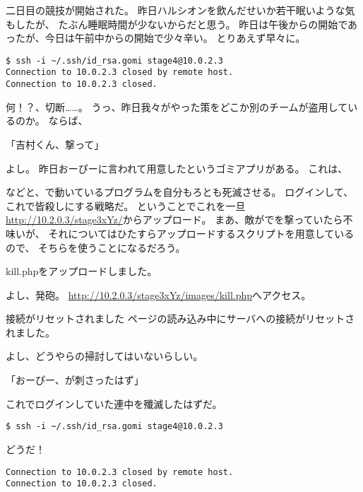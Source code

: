 二日目の競技が開始された。
昨日ハルシオンを飲んだせいか若干眠いような気もしたが、
たぶん睡眠時間が少ないからだと思う。
昨日は午後からの開始であったが、今日は午前中からの開始で少々辛い。
とりあえず早々に。

\begin{lstlisting}
$ ssh -i ~/.ssh/id_rsa.gomi stage4@10.0.2.3
Connection to 10.0.2.3 closed by remote host.
Connection to 10.0.2.3 closed.
\end{lstlisting}

何！？、切断……。
うっ、昨日我々がやった策をどこか別のチームが盗用しているのか。
ならば、

「吉村くん、撃って」

よし。
昨日おーぴーに言われて用意したというゴミアプリがある。
これは、



などと、で動いているプログラムを自分もろとも死滅させる。
ログインして、これで皆殺しにする戦略だ。
ということでこれを一旦\url{http://10.2.0.3/stage3xYz/}からアップロード。
まあ、敵がでを撃っていたら不味いが、
それについてはひたすらアップロードするスクリプトを用意しているので、
そちらを使うことになるだろう。

\begin{screen}
\centering
kill.phpをアップロードしました。
\end{screen}

よし、発砲。
\url{http://10.2.0.3/stage3xYz/images/kill.php}へアクセス。

\begin{itembox}[c]{接続がリセットされました}
ページの読み込み中にサーバへの接続がリセットされました。
\end{itembox}

よし、どうやらの掃討してはいないらしい。

「おーぴー、が刺さったはず」

これでログインしていた連中を殲滅したはずだ。

\begin{lstlisting}
$ ssh -i ~/.ssh/id_rsa.gomi stage4@10.0.2.3
\end{lstlisting}

どうだ！

\begin{lstlisting}
Connection to 10.0.2.3 closed by remote host.
Connection to 10.0.2.3 closed.
\end{lstlisting}

